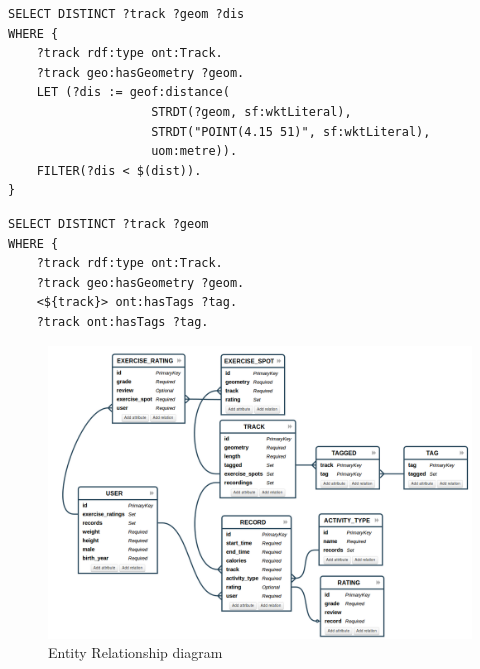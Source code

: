 \documentclass[11pt,a4paper]{scrreprt}
\begin{document}
\begin{lstlisting}[caption={Query for tracks within a specified distance of a point }, label = query:tracksbiking ]
SELECT DISTINCT ?track ?geom ?dis
WHERE {
    ?track rdf:type ont:Track.
    ?track geo:hasGeometry ?geom.
    LET (?dis := geof:distance( 
    				STRDT(?geom, sf:wktLiteral), 
    				STRDT("POINT(4.15 51)", sf:wktLiteral),
    				uom:metre)).
    FILTER(?dis < $(dist)).
}
\end{lstlisting}

\begin{lstlisting}[caption={Query for tracks with a tag common with a specified track }, label = query:tracksbiking ]
SELECT DISTINCT ?track ?geom
WHERE {
    ?track rdf:type ont:Track.
    ?track geo:hasGeometry ?geom.
    <${track}> ont:hasTags ?tag.
    ?track ont:hasTags ?tag.
\end{lstlisting}

\begin{figure}[h]
    \includegraphics[width=\textwidth]{er-diagram.png}
    \caption{Entity Relationship diagram}
    \label{db:er}
\end{figure}
\end{document}
